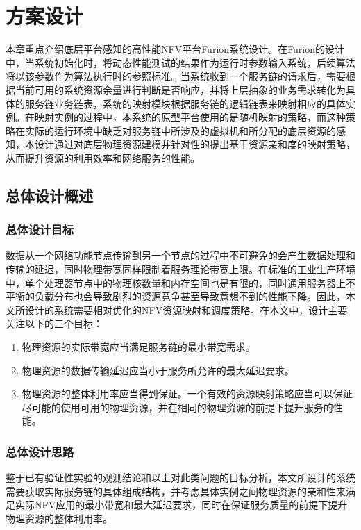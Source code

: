 \chapter{方案设计}
\label{chap:design}
本章重点介绍底层平台感知的高性能NFV平台Furion系统设计。在Furion的设计中，当系统初始化时，将动态性能测试的结果作为运行时参数输入系统，后续算法将以该参数作为算法执行时的参照标准。当系统收到一个服务链的请求后，需要根据当前可用的系统资源余量进行判断是否响应，并将上层抽象的业务需求转化为具体的服务链业务链表，系统的映射模块根据服务链的逻辑链表来映射相应的具体实例。在映射实例的过程中，本系统的原型平台使用的是随机映射的策略，而这种策略在实际的运行环境中缺乏对服务链中所涉及的虚拟机和所分配的底层资源的感知，本设计通过对底层物理资源建模并针对性的提出基于资源亲和度的映射策略，从而提升资源的利用效率和网络服务的性能。

\section{总体设计概述}
\subsection{总体设计目标}
数据从一个网络功能节点传输到另一个节点的过程中不可避免的会产生数据处理和传输的延迟，同时物理带宽同样限制着服务理论带宽上限。在标准的工业生产环境中，单个处理器节点中的物理核数量和内存空间也是有限的，同时通用服务器上不平衡的负载分布也会导致剧烈的资源竞争甚至导致意想不到的性能下降。因此，本文所设计的系统需要相对优化的NFV资源映射和调度策略。在本文中，设计主要关注以下的三个目标：
\begin{enumerate}
	\item 物理资源的实际带宽应当满足服务链的最小带宽需求。
	\item 物理资源的数据传输延迟应当小于服务所允许的最大延迟要求。
	\item 物理资源的整体利用率应当得到保证。一个有效的资源映射策略应当可以保证尽可能的使用可用的物理资源，并在相同的物理资源的前提下提升服务的性能。
\end{enumerate}

\subsection{总体设计思路}
鉴于已有验证性实验的观测结论和以上对此类问题的目标分析，本文所设计的系统需要获取实际服务链的具体组成结构，并考虑具体实例之间物理资源的亲和性来满足实际NFV应用的最小带宽和最大延迟要求，同时在保证服务质量的前提下提升物理资源的整体利用率。


